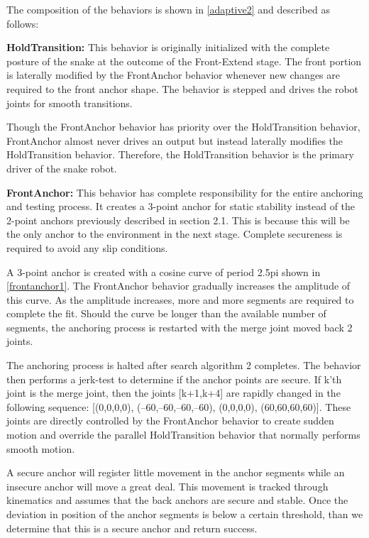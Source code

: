 The composition of the behaviors is shown in \autoref{adaptive2} and described as follows:

\textbf{HoldTransition:}
This behavior is originally initialized with the complete posture of the snake at the outcome of the Front-Extend stage. The front portion is laterally modified by the FrontAnchor behavior whenever new changes are required to the front anchor shape. The behavior is stepped and drives the robot joints for smooth transitions.

Though the FrontAnchor behavior has priority over the HoldTransition behavior, FrontAnchor almost never drives an output but instead laterally modifies the HoldTransition behavior. Therefore, the HoldTransition behavior is the primary driver of the snake robot.

\textbf{FrontAnchor:}
This behavior has complete responsibility for the entire anchoring and testing process. It creates a 3-point anchor for static stability instead of the 2-point anchors previously described in section 2.1. This is because this will be the only anchor to the environment in the next stage. Complete secureness is required to avoid any slip conditions.

A 3-point anchor is created with a cosine curve of period 2.5pi shown in \autoref{frontanchor1}. The FrontAnchor behavior gradually increases the amplitude of this curve. As the amplitude increases, more and more segments are required to complete the fit. Should the curve be longer than the available number of segments, the anchoring process is restarted with the merge joint moved back 2 joints.

The anchoring process is halted after search algorithm 2 completes. The behavior then performs a jerk-test to determine if the anchor points are secure. If k'th joint is the merge joint, then the joints [k+1,k+4] are rapidly changed in the following sequence: [(0,0,0,0), (--60,--60,--60,--60), (0,0,0,0), (60,60,60,60)]. These joints are directly controlled by the FrontAnchor behavior to create sudden motion and override the parallel HoldTransition behavior that normally performs smooth motion.

A secure anchor will register little movement in the anchor segments while an insecure anchor will move a great deal. This movement is tracked through kinematics and assumes that the back anchors are secure and stable. Once the deviation in position of the anchor segments is below a certain threshold, than we determine that this is a secure anchor and return success.

